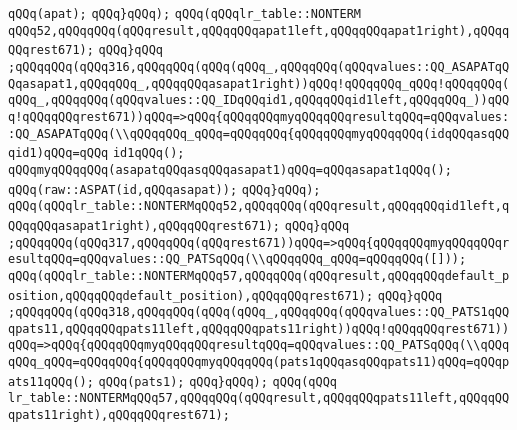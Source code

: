 \verb|qQQq(apat);|\newline
\verb|qQQq}qQQq);|\newline
\verb|qQQq(qQQqlr_table::NONTERM|\newline
\verb|qQQq52,qQQqqQQq(qQQqresult,qQQqqQQqapat1left,qQQqqQQqapat1right),qQQqqQQqrest671);|\newline
\verb|qQQq}qQQq|\newline
\verb|;qQQqqQQq(qQQq316,qQQqqQQq(qQQq(qQQq_,qQQqqQQq(qQQqvalues::QQ_ASAPATqQQqasapat1,qQQqqQQq_,qQQqqQQqasapat1right))qQQq!qQQqqQQq_qQQq!qQQqqQQq(qQQq_,qQQqqQQq(qQQqvalues::QQ_IDqQQqid1,qQQqqQQqid1left,qQQqqQQq_))qQQq!qQQqqQQqrest671))qQQq=>qQQq{qQQqqQQqmyqQQqqQQqresultqQQq=qQQqvalues::QQ_ASAPATqQQq(\\qQQqqQQq_qQQq=qQQqqQQq{qQQqqQQqmyqQQqqQQq(idqQQqasqQQqid1)qQQq=qQQq|\newline
\verb|id1qQQq();|\newline
\verb|qQQqmyqQQqqQQq(asapatqQQqasqQQqasapat1)qQQq=qQQqasapat1qQQq();|\newline
\verb|qQQq(raw::ASPAT(id,qQQqasapat));|\newline
\verb|qQQq}qQQq);|\newline
\verb|qQQq(qQQqlr_table::NONTERMqQQq52,qQQqqQQq(qQQqresult,qQQqqQQqid1left,qQQqqQQqasapat1right),qQQqqQQqrest671);|\newline
\verb|qQQq}qQQq|\newline
\verb|;qQQqqQQq(qQQq317,qQQqqQQq(qQQqrest671))qQQq=>qQQq{qQQqqQQqmyqQQqqQQqresultqQQq=qQQqvalues::QQ_PATSqQQq(\\qQQqqQQq_qQQq=qQQqqQQq([]));|\newline
\verb|qQQq(qQQqlr_table::NONTERMqQQq57,qQQqqQQq(qQQqresult,qQQqqQQqdefault_position,qQQqqQQqdefault_position),qQQqqQQqrest671);|\newline
\verb|qQQq}qQQq|\newline
\verb|;qQQqqQQq(qQQq318,qQQqqQQq(qQQq(qQQq_,qQQqqQQq(qQQqvalues::QQ_PATS1qQQqpats11,qQQqqQQqpats11left,qQQqqQQqpats11right))qQQq!qQQqqQQqrest671))qQQq=>qQQq{qQQqqQQqmyqQQqqQQqresultqQQq=qQQqvalues::QQ_PATSqQQq(\\qQQqqQQq_qQQq=qQQqqQQq{qQQqqQQqmyqQQqqQQq(pats1qQQqasqQQqpats11)qQQq=qQQqpats11qQQq();|\newline
\verb|qQQq(pats1);|\newline
\verb|qQQq}qQQq);|\newline
\verb|qQQq(qQQq|\newline
\verb|lr_table::NONTERMqQQq57,qQQqqQQq(qQQqresult,qQQqqQQqpats11left,qQQqqQQqpats11right),qQQqqQQqrest671);|\newline
